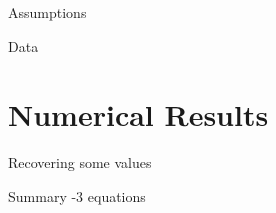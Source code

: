 \begin{frame}{Assumptions}

\end{frame}

\begin{frame}{Data}

\end{frame}

\section{Numerical Results}

\begin{frame}{Recovering some values}
\end{frame}

\begin{frame}{Summary}
-3 equations
\end{frame}


